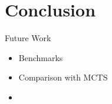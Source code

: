 \documentclass[10pt,mathserif]{beamer}
\begin{document}
\section{Conclusion}
\begin{frame}{Future Work}
\begin{itemize}\itemsep=24pt
\item Benchmarks
\item Comparison with MCTS
\item 
\end{itemize}
\end{frame}
\end{document}
